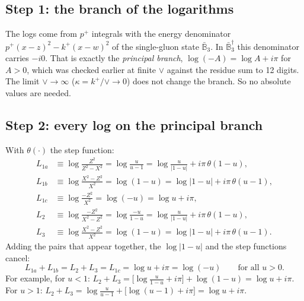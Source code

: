 \documentclass[10pt]{article}
\numberwithin{equation}{section}
\begin{document}
\subsection{Step 1: the branch of the logarithms}
The logs come from $p^{+}$ integrals with the energy denominator $p^{+}(x-z)^{2}-k^{+}(x-w)^{2}$ of the single-gluon state $\bar{\mathbb B}_{3}$. In $\bar{\mathbb B}_{3}^{\dagger}$ this denominator carries $-i0$. That is exactly the \emph{principal branch}, $\log(-A)=\log A+i\pi$ for $A>0$, which was checked earlier at finite $\vee$ against the residue sum to 12 digits. The limit $\vee\to\infty$ ($\kappa=k^{+}/\vee\to0$) does not change the branch. So no absolute values are needed.

\subsection{Step 2: every log on the principal branch}
With $\theta(\cdot)$ the step function:
\begin{align}
L_{1a}&\equiv\log\frac{Z^{2}}{Z^{2}-X^{2}}=\log\frac{u}{u-1}=\log\frac{u}{|1-u|}+i\pi\,\theta(1-u),\\
L_{1b}&\equiv\log\frac{X^{2}-Z^{2}}{X^{2}}=\log(1-u)=\log|1-u|+i\pi\,\theta(u-1),\\
L_{1c}&\equiv\log\frac{-Z^{2}}{X^{2}}=\log(-u)=\log u+i\pi,\\
L_{2}&\equiv\log\frac{-Z^{2}}{X^{2}-Z^{2}}=\log\frac{-u}{1-u}=\log\frac{u}{|1-u|}+i\pi\,\theta(1-u),\\
L_{3}&\equiv\log\frac{X^{2}-Z^{2}}{X^{2}}=\log(1-u)=\log|1-u|+i\pi\,\theta(u-1).
\end{align}
Adding the pairs that appear together, the $\log|1-u|$ and the step functions cancel:
\begin{equation}
\boxed{\;L_{1a}+L_{1b}=L_{2}+L_{3}=L_{1c}=\log u+i\pi=\log(-u)\qquad\text{for all }u>0.\;}
\label{eq:logsum}
\end{equation}
For example, for $u<1$: $L_{2}+L_{3}=\big[\log\frac{u}{1-u}+i\pi\big]+\log(1-u)=\log u+i\pi$. For $u>1$: $L_{2}+L_{3}=\log\frac{u}{u-1}+\big[\log(u-1)+i\pi\big]=\log u+i\pi$.
\end{document}
